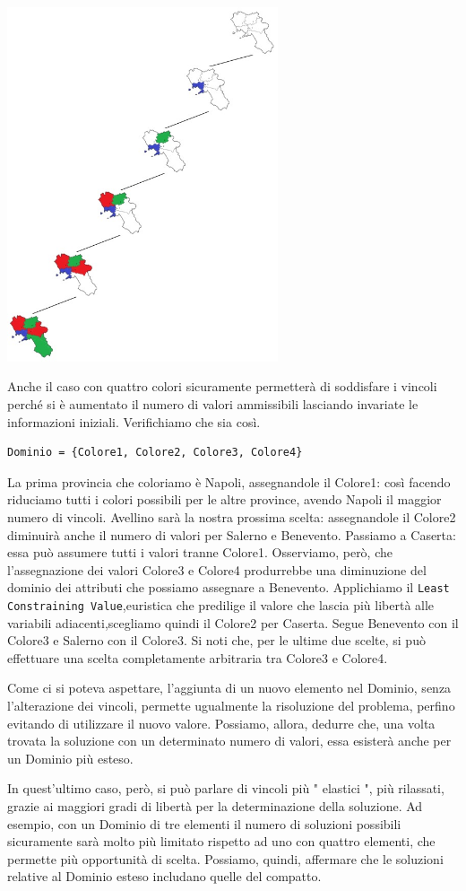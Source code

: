 		\begin{center}
			\includegraphics[width=0.6\textwidth, height=0.4\textheight]{SearchTree.jpg}
		\end{center}\par
		Anche il caso con quattro colori sicuramente permetterà di soddisfare i vincoli perché si è aumentato il numero di valori ammissibili lasciando invariate le informazioni iniziali. Verifichiamo che sia così.
		\begin{lstlisting}
Dominio = {Colore1, Colore2, Colore3, Colore4}
		\end{lstlisting}
		La prima provincia che coloriamo è Napoli, assegnandole il Colore1: così facendo riduciamo tutti i colori possibili per le altre province, avendo Napoli il maggior numero di vincoli. Avellino sarà la nostra prossima scelta: assegnandole il Colore2 diminuirà anche il numero di valori per Salerno e Benevento. Passiamo a Caserta: essa può assumere tutti i valori tranne Colore1. Osserviamo, però, che l'assegnazione dei valori Colore3 e Colore4 produrrebbe una diminuzione del dominio dei attributi che possiamo assegnare a Benevento. Applichiamo il \texttt{Least Constraining Value},euristica che predilige il valore che lascia più libertà alle variabili adiacenti,scegliamo quindi il Colore2 per  Caserta. Segue Benevento con il Colore3 e Salerno con il Colore3. Si noti che, per le ultime due scelte, si può effettuare una scelta completamente arbitraria tra Colore3 e Colore4.\par
		Come ci si poteva aspettare, l'aggiunta di un nuovo elemento nel Dominio, senza l'alterazione dei vincoli, permette ugualmente la risoluzione del problema, perfino evitando di utilizzare il nuovo valore. Possiamo, allora, dedurre che, una volta trovata la soluzione con un determinato numero di valori, essa esisterà anche per un Dominio più esteso.\par 
		In quest'ultimo caso, però, si può parlare di vincoli più " elastici ", più rilassati, grazie ai maggiori gradi di libertà per la determinazione della soluzione. Ad esempio, con un Dominio di tre elementi il numero di soluzioni possibili sicuramente sarà molto più limitato rispetto ad uno con quattro elementi, che permette più opportunità di scelta. Possiamo, quindi, affermare che le soluzioni relative al Dominio esteso includano quelle del compatto. 
